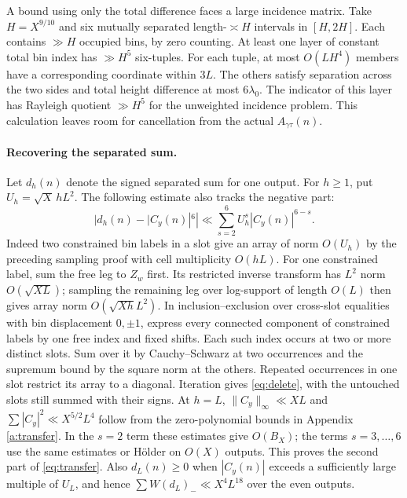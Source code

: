 \documentclass[11pt,a4paper]{article}
\begin{document}
A bound using only the total difference faces a large incidence matrix. Take \(H=X^{9/10}\) and six mutually separated length-\(\asymp H\) intervals in \([H,2H]\). Each contains \(\gg H\) occupied bins, by zero counting. At least one layer of constant total bin index has \(\gg H^5\) six-tuples. For each tuple, at most \(O(LH^4)\) members have a corresponding coordinate within \(3L\). The others satisfy separation across the two sides and total height difference at most \(6\lambda_0\). The indicator of this layer has Rayleigh quotient \(\gg H^5\) for the unweighted incidence problem. This calculation leaves room for cancellation from the actual \(A_{\gamma\tau}(n)\).

\paragraph{Recovering the separated sum.}
Let \(d_h(n)\) denote the signed separated sum for one output. For \(h\ge1\), put \(U_h=\sqrt X\,hL^2\). The following estimate also tracks the negative part:
\begin{equation}
 |d_h(n)-|C_y(n)|^6|\ll\sum_{s=2}^6 U_h^s|C_y(n)|^{6-s}.
 \label{eq:delete}
\end{equation}
Indeed two constrained bin labels in a slot give an array of norm \(O(U_h)\) by the preceding sampling proof with cell multiplicity \(O(hL)\). For one constrained label, sum the free leg to \(Z_w\) first. Its restricted inverse transform has \(L^2\) norm \(O(\sqrt{XL})\); sampling the remaining leg over log-support of length \(O(L)\) then gives array norm \(O(\sqrt{Xh}L^2)\). In inclusion--exclusion over cross-slot equalities with bin displacement \(0,\pm1\), express every connected component of constrained labels by one free index and fixed shifts. Each such index occurs at two or more distinct slots. Sum over it by Cauchy--Schwarz at two occurrences and the supremum bound by the square norm at the others. Repeated occurrences in one slot restrict its array to a diagonal. Iteration gives \eqref{eq:delete}, with the untouched slots still summed with their signs. At \(h=L\), \(\|C_y\|_\infty\ll XL\) and \(\sum|C_y|^2\ll X^{5/2}L^4\) follow from the zero-polynomial bounds in Appendix \ref{a:transfer}. In the \(s=2\) term these estimates give \(O(B_X)\); the terms \(s=3,\ldots,6\) use the same estimates or Hölder on \(O(X)\) outputs. This proves the second part of \eqref{eq:transfer}. Also \(d_L(n)\ge0\) when \(|C_y(n)|\) exceeds a sufficiently large multiple of \(U_L\), and hence \(\sum W(d_L)_-\ll X^4L^{18}\) over the even outputs.
\end{document}
